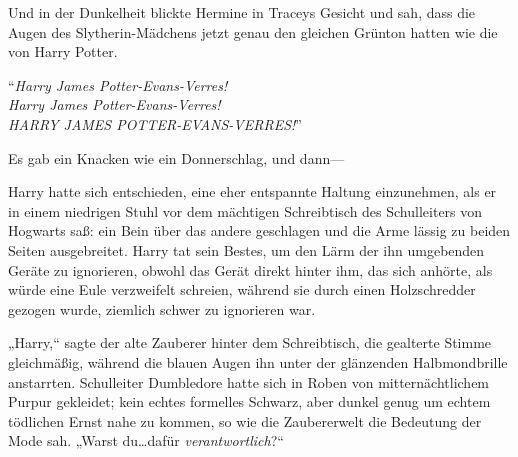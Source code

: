 Und in der Dunkelheit blickte Hermine in Traceys Gesicht und sah, dass die Augen des Slytherin-Mädchens jetzt genau den gleichen Grünton hatten wie die von Harry Potter.

“\emph{Harry James Potter-Evans-Verres!\\
Harry James Potter-Evans-Verres!\\
HARRY JAMES POTTER-EVANS-VERRES!}”

Es gab ein Knacken wie ein Donnerschlag, und dann—

\later

Harry hatte sich entschieden, eine eher entspannte Haltung einzunehmen, als er in einem niedrigen Stuhl vor dem mächtigen Schreibtisch des Schulleiters von Hogwarts saß: ein Bein über das andere geschlagen und die Arme lässig zu beiden Seiten ausgebreitet. Harry tat sein Bestes, um den Lärm der ihn umgebenden Geräte zu ignorieren, obwohl das Gerät direkt hinter ihm, das sich anhörte, als würde eine Eule verzweifelt schreien, während sie durch einen Holzschredder gezogen wurde, ziemlich schwer zu ignorieren war.

„Harry,“ sagte der alte Zauberer hinter dem Schreibtisch, die gealterte Stimme gleichmäßig, während die blauen Augen ihn unter der glänzenden Halbmondbrille anstarrten. Schulleiter Dumbledore hatte sich in Roben von mitternächtlichem Purpur gekleidet; kein echtes formelles Schwarz, aber dunkel genug um echtem tödlichen Ernst nahe zu kommen, so wie die Zaubererwelt die Bedeutung der Mode sah. „Warst du…dafür \emph{verantwortlich}?“


